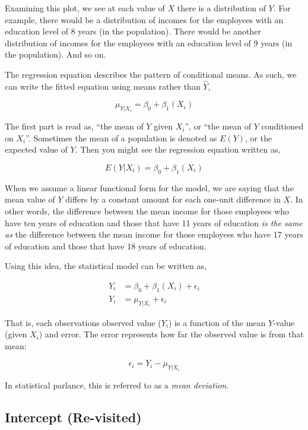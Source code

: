 \documentclass[]{book}
\theoremstyle{definition}
\theoremstyle{definition}
\theoremstyle{definition}
\theoremstyle{remark}
\begin{document}
Examining this plot, we see at each value of \(X\) there is a
distribution of \(Y\). For example, there would be a distribution of
incomes for the employees with an education level of 8 years (in the
population). There would be another distribution of incomes for the
employees with an education level of 9 years (in the population). And so
on.

The regression equation describes the pattern of conditional means. As
such, we can write the fitted equation using means rather than
\(\hat{Y}\),

\[
\mu_{Y|X_i} = \beta_0 + \beta_1(X_i)
\]

The first part is read as, ``the mean of \(Y\) given \(X_i\)'', or ``the
mean of \(Y\) conditioned on \(X_i\)''. Sometimes the mean of a
population is denoted as \(E(Y)\), or the expected value of \(Y\). Then
you might see the regression equation written as,

\[
E(Y|X_i) = \beta_0 + \beta_1(X_i)
\]

When we assume a linear functional form for the model, we are saying
that the mean value of \(Y\) differs by a constant amount for each
one-unit difference in \(X\). In other words, the difference between the
mean income for those employees who have ten years of education and
those that have 11 years of education \emph{is the same as} the
difference between the mean income for those employees who have 17 years
of education and those that have 18 years of education.

Using this idea, the statistical model can be written as,

\[
\begin{split}
Y_i &= \beta_0 + \beta_1(X_i) + \epsilon_i \\
Y_i &= \mu_{Y|X_i} + \epsilon_i
\end{split}
\]

That is, each observations observed value (\(Y_i\)) is a function of the
mean \(Y\)-value (given \(X_i\)) and error. The error represents how far
the observed value is from that mean:

\[
\epsilon_i  = Y_i - \mu_{Y|X_i}
\]

In statistical parlance, this is referred to as a \emph{mean deviation}.

\hypertarget{intercept-re-visited}{%
\subsection{Intercept (Re-visited)}\label{intercept-re-visited}}
\end{document}
